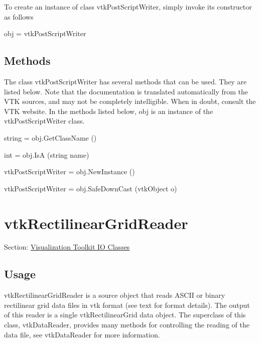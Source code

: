 To create an instance of class vtk\-Post\-Script\-Writer, simply invoke its constructor as follows \begin{DoxyVerb}  obj = vtkPostScriptWriter
\end{DoxyVerb}
 \hypertarget{vtkwidgets_vtkxyplotwidget_Methods}{}\subsection{Methods}\label{vtkwidgets_vtkxyplotwidget_Methods}
The class vtk\-Post\-Script\-Writer has several methods that can be used. They are listed below. Note that the documentation is translated automatically from the V\-T\-K sources, and may not be completely intelligible. When in doubt, consult the V\-T\-K website. In the methods listed below, {\ttfamily obj} is an instance of the vtk\-Post\-Script\-Writer class. 
\begin{DoxyItemize}
\item {\ttfamily string = obj.\-Get\-Class\-Name ()}  
\item {\ttfamily int = obj.\-Is\-A (string name)}  
\item {\ttfamily vtk\-Post\-Script\-Writer = obj.\-New\-Instance ()}  
\item {\ttfamily vtk\-Post\-Script\-Writer = obj.\-Safe\-Down\-Cast (vtk\-Object o)}  
\end{DoxyItemize}\hypertarget{vtkio_vtkrectilineargridreader}{}\section{vtk\-Rectilinear\-Grid\-Reader}\label{vtkio_vtkrectilineargridreader}
Section\-: \hyperlink{sec_vtkio}{Visualization Toolkit I\-O Classes} \hypertarget{vtkwidgets_vtkxyplotwidget_Usage}{}\subsection{Usage}\label{vtkwidgets_vtkxyplotwidget_Usage}
vtk\-Rectilinear\-Grid\-Reader is a source object that reads A\-S\-C\-I\-I or binary rectilinear grid data files in vtk format (see text for format details). The output of this reader is a single vtk\-Rectilinear\-Grid data object. The superclass of this class, vtk\-Data\-Reader, provides many methods for controlling the reading of the data file, see vtk\-Data\-Reader for more information.

